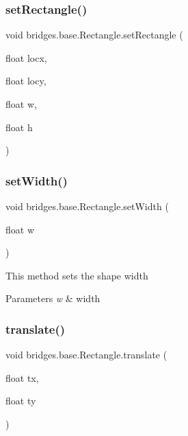 \subsubsection{\texorpdfstring{set\+Rectangle()}{setRectangle()}}
{\footnotesize\ttfamily void bridges.\+base.\+Rectangle.\+set\+Rectangle (\begin{DoxyParamCaption}\item[{float}]{locx,  }\item[{float}]{locy,  }\item[{float}]{w,  }\item[{float}]{h }\end{DoxyParamCaption})}

\mbox{\label{classbridges_1_1base_1_1_rectangle_a1c42d0e5fc64adc1c2a696c88dd6f82e}} 
\subsubsection{\texorpdfstring{set\+Width()}{setWidth()}}
{\footnotesize\ttfamily void bridges.\+base.\+Rectangle.\+set\+Width (\begin{DoxyParamCaption}\item[{float}]{w }\end{DoxyParamCaption})}

This method sets the shape width


\begin{DoxyParams}{Parameters}
{\em w} & width \\
\hline
\end{DoxyParams}
\mbox{\label{classbridges_1_1base_1_1_rectangle_a4fed6a85f136c7946ea4e79f2553cffe}} 
\subsubsection{\texorpdfstring{translate()}{translate()}}
{\footnotesize\ttfamily void bridges.\+base.\+Rectangle.\+translate (\begin{DoxyParamCaption}\item[{float}]{tx,  }\item[{float}]{ty }\end{DoxyParamCaption})}

